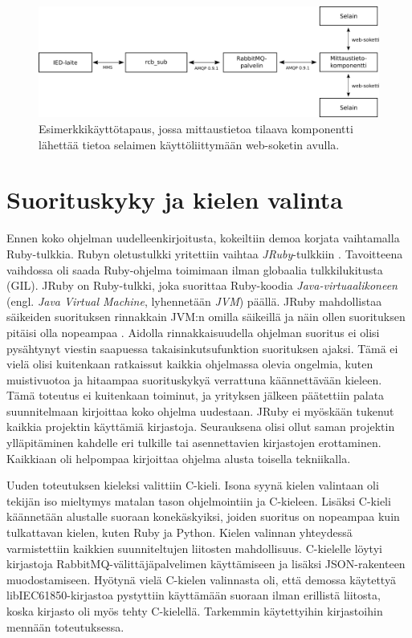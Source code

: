 \begin{figure}[ht!]
	\includegraphics[width=1\textwidth]{pictures/example-use-case.png}
	\caption{Esimerkkikäyttötapaus, jossa mittaustietoa tilaava komponentti lähettää tietoa selaimen käyttöliittymään web-soketin avulla.}
	\label{fig:example-use-case}
\end{figure}


\section{Suorituskyky ja kielen valinta}
Ennen koko ohjelman uudelleenkirjoitusta, kokeiltiin demoa korjata vaihtamalla Ruby-tulkkia. Rubyn oletustulkki yritettiin vaihtaa \emph{JRuby}-tulkkiin \cite{jruby-homepage}. Tavoitteena vaihdossa oli saada Ruby-ohjelma toimimaan ilman globaalia tulkkilukitusta (GIL). JRuby on Ruby-tulkki, joka suorittaa Ruby-koodia \emph{Java-virtuaalikoneen} (engl. \emph{Java Virtual Machine}, lyhennetään \emph{JVM}) päällä. JRuby mahdollistaa säikeiden suorituksen rinnakkain JVM:n omilla säikeillä ja näin ollen suorituksen pitäisi olla nopeampaa \mbox{\cite{Youssef2013}}. Aidolla rinnakkaisuudella ohjelman suoritus ei olisi pysähtynyt viestin saapuessa takaisinkutsufunktion suorituksen ajaksi. Tämä ei vielä olisi kuitenkaan ratkaissut kaikkia ohjelmassa olevia ongelmia, kuten muistivuotoa ja hitaampaa suorituskykyä verrattuna käännettävään kieleen. Tämä toteutus ei kuitenkaan toiminut, ja yrityksen jälkeen päätettiin palata suunnitelmaan kirjoittaa koko ohjelma uudestaan. JRuby ei myöskään tukenut kaikkia projektin käyttämiä kirjastoja. Seurauksena olisi ollut saman projektin ylläpitäminen kahdelle eri tulkille tai asennettavien kirjastojen erottaminen. Kaikkiaan oli helpompaa kirjoittaa ohjelma alusta toisella tekniikalla.

Uuden toteutuksen kieleksi valittiin C-kieli. Isona syynä kielen valintaan oli tekijän iso mieltymys matalan tason ohjelmointiin ja C-kieleen. Lisäksi C-kieli käännetään alustalle suoraan konekäskyiksi, joiden suoritus on nopeampaa kuin tulkattavan kielen, kuten Ruby ja Python. Kielen valinnan yhteydessä varmistettiin kaikkien suunniteltujen liitosten mahdollisuus. C-kielelle löytyi kirjastoja RabbitMQ-välittäjäpalvelimen käyttämiseen ja lisäksi JSON-rakenteen muodostamiseen. Hyötynä vielä C-kielen valinnasta oli, että demossa käytettyä libIEC61850-kirjastoa pystyttiin käyttämään suoraan ilman erillistä liitosta, koska kirjasto oli myös tehty C-kielellä. Tarkemmin käytettyihin kirjastoihin mennään toteutuksessa.


